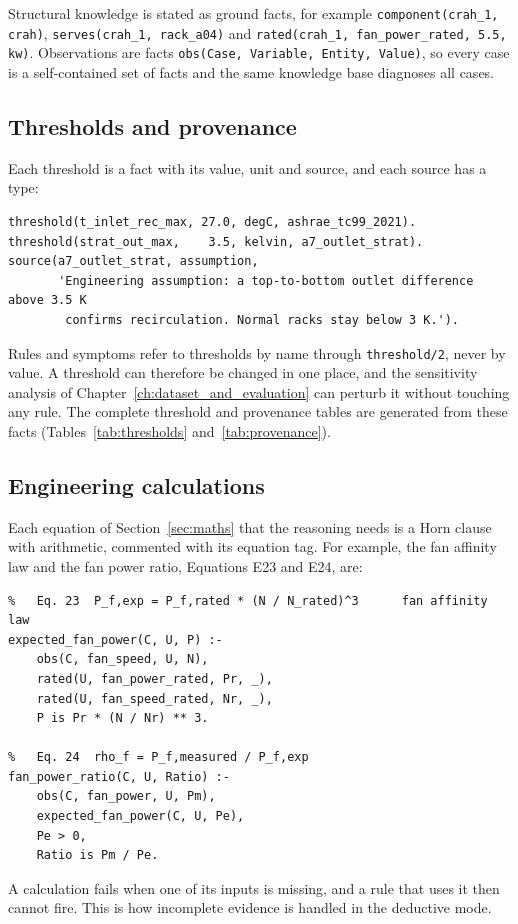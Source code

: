 Structural knowledge is stated as ground facts, for example \texttt{component(crah\_1, crah)}, \texttt{serves(crah\_1, rack\_a04)} and \texttt{rated(crah\_1, fan\_power\_rated, 5.5, kw)}. Observations are facts \texttt{obs(Case, Variable, Entity, Value)}, so every case is a self-contained set of facts and the same knowledge base diagnoses all cases.

\subsection{Thresholds and provenance}

Each threshold is a fact with its value, unit and source, and each source has a type:
\begin{lstlisting}
threshold(t_inlet_rec_max, 27.0, degC, ashrae_tc99_2021).
threshold(strat_out_max,    3.5, kelvin, a7_outlet_strat).
source(a7_outlet_strat, assumption,
       'Engineering assumption: a top-to-bottom outlet difference above 3.5 K
        confirms recirculation. Normal racks stay below 3 K.').
\end{lstlisting}
Rules and symptoms refer to thresholds by name through \texttt{threshold/2}, never by value. A threshold can therefore be changed in one place, and the sensitivity analysis of Chapter~\ref{ch:dataset_and_evaluation} can perturb it without touching any rule. The complete threshold and provenance tables are generated from these facts (Tables~\ref{tab:thresholds} and~\ref{tab:provenance}).

\subsection{Engineering calculations}

Each equation of Section~\ref{sec:maths} that the reasoning needs is a Horn clause with arithmetic, commented with its equation tag. For example, the fan affinity law and the fan power ratio, Equations E23 and E24, are:
\begin{lstlisting}
%   Eq. 23  P_f,exp = P_f,rated * (N / N_rated)^3      fan affinity law
expected_fan_power(C, U, P) :-
    obs(C, fan_speed, U, N),
    rated(U, fan_power_rated, Pr, _),
    rated(U, fan_speed_rated, Nr, _),
    P is Pr * (N / Nr) ** 3.

%   Eq. 24  rho_f = P_f,measured / P_f,exp
fan_power_ratio(C, U, Ratio) :-
    obs(C, fan_power, U, Pm),
    expected_fan_power(C, U, Pe),
    Pe > 0,
    Ratio is Pm / Pe.
\end{lstlisting}
A calculation fails when one of its inputs is missing, and a rule that uses it then cannot fire. This is how incomplete evidence is handled in the deductive mode.

